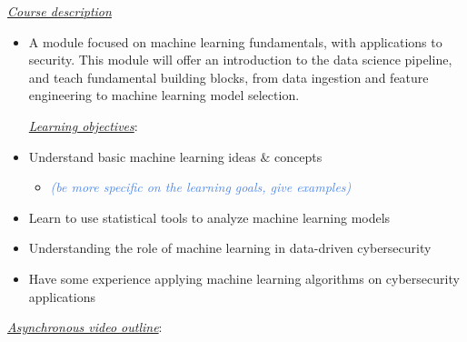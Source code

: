 \documentclass[12pt]{article}
\renewcommand{\_}{\kern-1.5pt\textunderscore\kern-1.5pt}
\begin{document}
\vspace{\baselineskip}
\textit{\uline{Course description}}\par

\begin{itemize}
	\item A module focused on machine learning fundamentals, with applications to security. This module will offer an introduction to the data science pipeline, and teach fundamental building blocks, from data ingestion and feature engineering to machine learning model selection. \par


\vspace{\baselineskip}
\textit{\uline{Learning objectives}}:\par

	\item Understand basic machine learning ideas $\&$  concepts\par

\begin{itemize}
	\item \textit{\textcolor[HTML]{4A86E8}{(be more specific on the learning goals, give examples)}}\par


\end{itemize}
	\item Learn to use statistical tools to analyze machine learning models\par

	\item Understanding the role of machine learning in data-driven cybersecurity\par

	\item Have some experience applying machine learning algorithms on cybersecurity applications
\end{itemize}\par


\vspace{\baselineskip}

\vspace{\baselineskip}
\textit{\uline{Asynchronous video outline}}:\par
\end{document}
